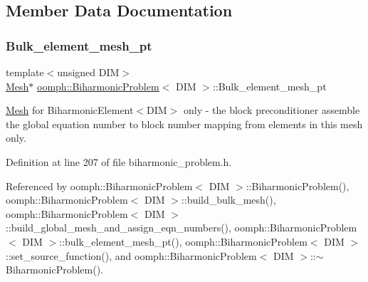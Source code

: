 \subsection{Member Data Documentation}
\mbox{\label{classoomph_1_1BiharmonicProblem_a62b9e4a4040c57379423acf04145ba78}} 
\subsubsection{\texorpdfstring{Bulk\+\_\+element\+\_\+mesh\+\_\+pt}{Bulk\_element\_mesh\_pt}}
{\footnotesize\ttfamily template$<$unsigned D\+IM$>$ \\
\hyperlink{classoomph_1_1Mesh}{Mesh}$\ast$ \hyperlink{classoomph_1_1BiharmonicProblem}{oomph\+::\+Biharmonic\+Problem}$<$ D\+IM $>$\+::Bulk\+\_\+element\+\_\+mesh\+\_\+pt}



\hyperlink{classoomph_1_1Mesh}{Mesh} for Biharmonic\+Element$<$\+D\+I\+M$>$ only -\/ the block preconditioner assemble the global equation number to block number mapping from elements in this mesh only. 



Definition at line 207 of file biharmonic\+\_\+problem.\+h.



Referenced by oomph\+::\+Biharmonic\+Problem$<$ D\+I\+M $>$\+::\+Biharmonic\+Problem(), oomph\+::\+Biharmonic\+Problem$<$ D\+I\+M $>$\+::build\+\_\+bulk\+\_\+mesh(), oomph\+::\+Biharmonic\+Problem$<$ D\+I\+M $>$\+::build\+\_\+global\+\_\+mesh\+\_\+and\+\_\+assign\+\_\+eqn\+\_\+numbers(), oomph\+::\+Biharmonic\+Problem$<$ D\+I\+M $>$\+::bulk\+\_\+element\+\_\+mesh\+\_\+pt(), oomph\+::\+Biharmonic\+Problem$<$ D\+I\+M $>$\+::set\+\_\+source\+\_\+function(), and oomph\+::\+Biharmonic\+Problem$<$ D\+I\+M $>$\+::$\sim$\+Biharmonic\+Problem().

\mbox{\label{classoomph_1_1BiharmonicProblem_af5ca1abca1c8ad4d56822d643c33cdd8}} 

